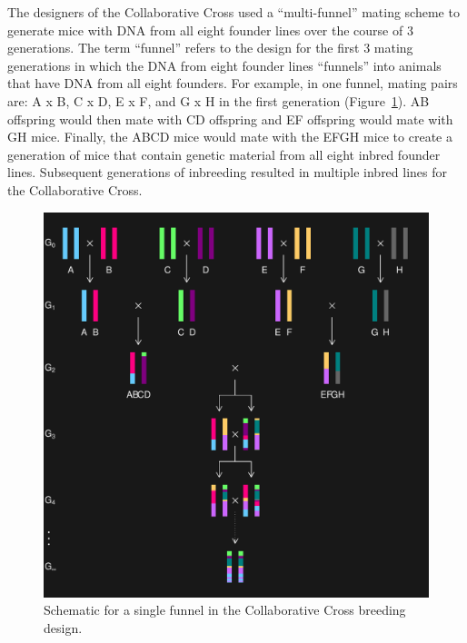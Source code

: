 \documentclass[oneside]{book}\usepackage[]{graphicx}\usepackage[]{color}
\makeatletter
\def\maxwidth{ %
  \ifdim\Gin@nat@width>\linewidth
    \linewidth
  \else
    \Gin@nat@width
  \fi
}
\newenvironment{knitrout}{}{} %
\makeatother
\begin{document}
The designers of the Collaborative Cross used a ``multi-funnel'' mating scheme to generate
mice with DNA from all eight founder lines over the course of 3 generations.
The term ``funnel'' refers to the design for the first 3 mating generations in which the
DNA from eight founder lines ``funnels'' into animals that have DNA from all eight founders.
For example, in one funnel, mating pairs are: A x B, C x D, E x F, and G x H in the first generation (Figure~\ref{fig:ri8}).
AB offspring would then mate with CD offspring and EF offspring would mate with GH mice.
Finally, the ABCD mice would mate with the EFGH mice to create a generation of mice that
contain genetic material from all eight inbred founder lines.
Subsequent generations of inbreeding resulted in multiple inbred lines for the Collaborative Cross.

\begin{knitrout}
\color{fgcolor}\begin{figure}
\includegraphics[width=\maxwidth]{figure/ri8-1} \caption[Schematic for a single funnel in the Collaborative Cross breeding design]{Schematic for a single funnel in the Collaborative Cross breeding design.}\label{fig:ri8}
\end{figure}


\end{knitrout}
\end{document}
